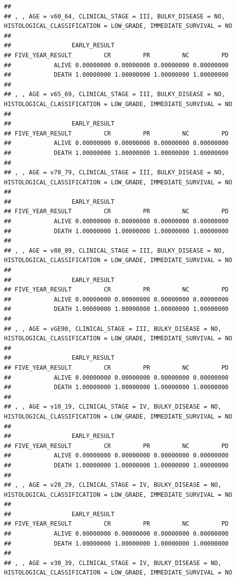\documentclass[]{article}
\begin{document}
\begin{verbatim}
## 
## , , AGE = v60_64, CLINICAL_STAGE = III, BULKY_DISEASE = NO, HISTOLOGICAL_CLASSIFICATION = LOW_GRADE, IMMEDIATE_SURVIVAL = NO
## 
##                 EARLY_RESULT
## FIVE_YEAR_RESULT         CR         PR         NC         PD
##            ALIVE 0.00000000 0.00000000 0.00000000 0.00000000
##            DEATH 1.00000000 1.00000000 1.00000000 1.00000000
## 
## , , AGE = v65_69, CLINICAL_STAGE = III, BULKY_DISEASE = NO, HISTOLOGICAL_CLASSIFICATION = LOW_GRADE, IMMEDIATE_SURVIVAL = NO
## 
##                 EARLY_RESULT
## FIVE_YEAR_RESULT         CR         PR         NC         PD
##            ALIVE 0.00000000 0.00000000 0.00000000 0.00000000
##            DEATH 1.00000000 1.00000000 1.00000000 1.00000000
## 
## , , AGE = v70_79, CLINICAL_STAGE = III, BULKY_DISEASE = NO, HISTOLOGICAL_CLASSIFICATION = LOW_GRADE, IMMEDIATE_SURVIVAL = NO
## 
##                 EARLY_RESULT
## FIVE_YEAR_RESULT         CR         PR         NC         PD
##            ALIVE 0.00000000 0.00000000 0.00000000 0.00000000
##            DEATH 1.00000000 1.00000000 1.00000000 1.00000000
## 
## , , AGE = v80_89, CLINICAL_STAGE = III, BULKY_DISEASE = NO, HISTOLOGICAL_CLASSIFICATION = LOW_GRADE, IMMEDIATE_SURVIVAL = NO
## 
##                 EARLY_RESULT
## FIVE_YEAR_RESULT         CR         PR         NC         PD
##            ALIVE 0.00000000 0.00000000 0.00000000 0.00000000
##            DEATH 1.00000000 1.00000000 1.00000000 1.00000000
## 
## , , AGE = vGE90, CLINICAL_STAGE = III, BULKY_DISEASE = NO, HISTOLOGICAL_CLASSIFICATION = LOW_GRADE, IMMEDIATE_SURVIVAL = NO
## 
##                 EARLY_RESULT
## FIVE_YEAR_RESULT         CR         PR         NC         PD
##            ALIVE 0.00000000 0.00000000 0.00000000 0.00000000
##            DEATH 1.00000000 1.00000000 1.00000000 1.00000000
## 
## , , AGE = v10_19, CLINICAL_STAGE = IV, BULKY_DISEASE = NO, HISTOLOGICAL_CLASSIFICATION = LOW_GRADE, IMMEDIATE_SURVIVAL = NO
## 
##                 EARLY_RESULT
## FIVE_YEAR_RESULT         CR         PR         NC         PD
##            ALIVE 0.00000000 0.00000000 0.00000000 0.00000000
##            DEATH 1.00000000 1.00000000 1.00000000 1.00000000
## 
## , , AGE = v20_29, CLINICAL_STAGE = IV, BULKY_DISEASE = NO, HISTOLOGICAL_CLASSIFICATION = LOW_GRADE, IMMEDIATE_SURVIVAL = NO
## 
##                 EARLY_RESULT
## FIVE_YEAR_RESULT         CR         PR         NC         PD
##            ALIVE 0.00000000 0.00000000 0.00000000 0.00000000
##            DEATH 1.00000000 1.00000000 1.00000000 1.00000000
## 
## , , AGE = v30_39, CLINICAL_STAGE = IV, BULKY_DISEASE = NO, HISTOLOGICAL_CLASSIFICATION = LOW_GRADE, IMMEDIATE_SURVIVAL = NO

\end{verbatim}
\end{document}
